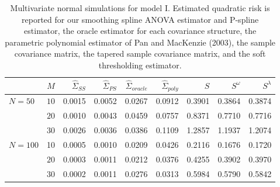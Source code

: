 \begin{table}[H]\label{simulation-1-entropy-loss-sigma-2}
\centering
\caption{Multivariate normal simulations for model I. Estimated quadratic risk is reported for our smoothing spline ANOVA estimator and P-spline estimator, the oracle estimator for each covariance structure, the parametric polynomial estimator of Pan and MacKenzie (2003), the sample covariance matrix, the tapered sample covariance matrix,
                                    and the soft thresholding estimator.}
\begin{tabular}{lrrrrrrrr}
& $M$ &$\hat{\Sigma}_{SS}$& $\hat{\Sigma}_{PS}$ &$\hat{\Sigma}_{oracle}$& $\hat{\Sigma}_{poly}$ & $S$ &$S^\omega$& $S^\lambda$ \\ 
  \hline
  $N = 50$ & $10$ & 0.0015 & 0.0052 & 0.0267 & 0.0912 & 0.3901 & 0.3864 & 0.3874 \\ 
   & $20$ & 0.0010 & 0.0043 & 0.0459 & 0.0757 & 0.8371 & 0.7710 & 0.7716 \\ 
   & $30$ & 0.0026 & 0.0036 & 0.0386 & 0.1109 & 1.2857 & 1.1937 & 1.2074 \\ 
 $N = 100$ & 10 & 0.0005 & 0.0010 & 0.0209 & 0.0426 & 0.2116 & 0.1676 & 0.1720 \\ 
    &   $20$ & 0.0003 & 0.0011 & 0.0212 & 0.0376 & 0.4255 & 0.3902 & 0.3970 \\ 
    &   $30$ & 0.0002 & 0.0011 & 0.0276 & 0.0313 & 0.5984 & 0.5790 & 0.5842 \\ 
   \hline
\end{tabular} 
\end{table}
